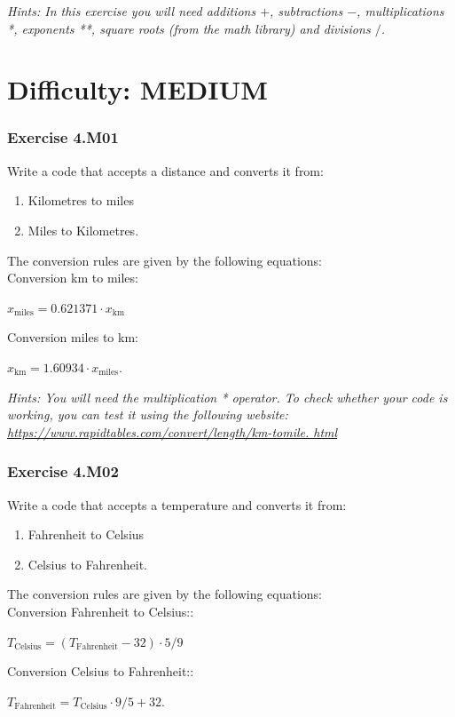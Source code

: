 \textit{Hints:
In this exercise you will need additions $+$, subtractions $-$, multiplications *, exponents **, square roots {} (from the math library) and divisions $/$.}




\section{Difficulty: MEDIUM}

\subsubsection*{Exercise 4.M01}
Write a code that accepts a distance and converts it from:
\begin{enumerate}[label=(\alph*)]
	\item Kilometres to miles
	\item Miles to Kilometres.
\end{enumerate}
The conversion rules are given by the following equations:\\
Conversion km to miles:
\begin{center}
	$x_{\textrm{miles}} = 0.621371 \cdot x_{\textrm{km}}$
\end{center}
Conversion miles to km:
\begin{center}
	$x_{\textrm{km}} = 1.60934 \cdot x_{\textrm{miles}}$.
\end{center}


\textit{Hints:
You will need the multiplication * operator. To check whether your code is working, you can
test it using the following website: \url{https://www.rapidtables.com/convert/length/km-tomile.
html}}\\[1cm]



\subsubsection*{Exercise 4.M02}
Write a code that accepts a temperature and converts it from:
\begin{enumerate}[label=(\alph*)]
	\item Fahrenheit to Celsius
	\item Celsius to Fahrenheit.
\end{enumerate}
The conversion rules are given by the following equations:\\
Conversion Fahrenheit to Celsius::
\begin{center}
	$T_{\textrm{Celsius}} = (T_{\textrm{Fahrenheit}}-32)\cdot 5/9$
\end{center}
Conversion Celsius to Fahrenheit::
\begin{center}
	$T_{\textrm{Fahrenheit}} = T_{\textrm{Celsius}} \cdot 9/5 + 32$.
\end{center}


